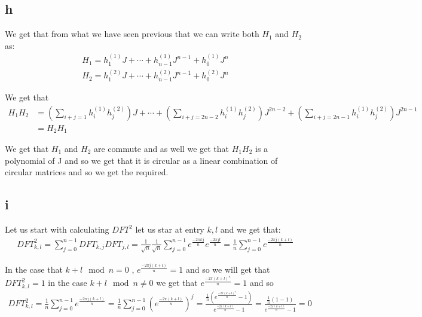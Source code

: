 \documentclass[english]{extarticle}
\numberwithin{equation}{section}
\numberwithin{figure}{section}
\begin{document}
\subsection*{h}
We get that from what we have seen previous that we can write both $H_1$ and $H_2$ as:
\begin{align}
    H_1 = h_{1}^{(1)}J + \cdots + h_{n-1}^{(1)}J^{n-1} + h_{0}^{(1)}J^{n} \\
    H_2 = h_{1}^{(2)}J + \cdots + h_{n-1}^{(2)}J^{n-1} + h_{0}^{(2)}J^{n}
\end{align}

We get that 
\begin{align}
    H_{1}H_{2} &= (\sum_{i+j=1}h_{i}^{(1)}h_{j}^{(2)})J + \cdots + 
    (\sum_{i+j=2n-2}h_{i}^{(1)}h_{j}^{(2)})J^{2n-2} + (\sum_{i+j=2n-1}h_{i}^{(1)}h_{j}^{(2)})J^{2n-1} \nonumber \\[2ex] 
    &= H_{2}H_{1}
\end{align}

We get that $H_1$ and $H_2$ are commute and as well we get that $H_{1}H_{2}$ is a polynomial of J and so we get that it is circular as a linear combination of circular matrices and so we get the required.
\subsection*{i}
Let us start with calculating $DFT^{2}$ let us star at entry $k,l$ and we get that:
\begin{align}
    DFT_{k,l}^{2}=  \sum_{j = 0}^{n-1}DFT_{k,j}DFT_{j,l} = \frac{1}{\sqrt{n}}\frac{1}{\sqrt{n}}\sum_{j=0}^{n-1}e^{\frac{-2 \pi k j}{n}} e^{\frac{-2 \pi j l}{n}} = \frac{1}{n} \sum_{j=0}^{n-1} e^{\frac{-2 \pi j (k+l)}{n}}
\end{align}

In the case that $k+l\mod{n} = 0$ , $e^{\frac{-2 \pi j (k+l)}{n}} = 1$ and so we will get that $DFT_{k,l}^{2} = 1$ in the case $k+l\mod{n} \neq 0$ we get that $e^{\frac{-2 \pi (k+l)^{n}}{n}} = 1$ and so
\begin{align}
    DFT_{k,l}^{2}= \frac{1}{n} \sum_{j=0}^{n-1} e^{\frac{-2 \pi j (k+l)}{n}} = \frac{1}{n} \sum_{j=0}^{n-1} (e^{\frac{-2 \pi (k+l)}{n}})^{j} = \frac{\frac{1}{n}(e^{\frac{-2 \pi (k+l)^{n}}{n}}-1)}{e^{\frac{-2 \pi (k+l)}{n}} - 1} = \frac{\frac{1}{n}(1 - 1)}{e^{\frac{-2 \pi (k+l)}{n}} - 1} = 0
\end{align}
\end{document}
